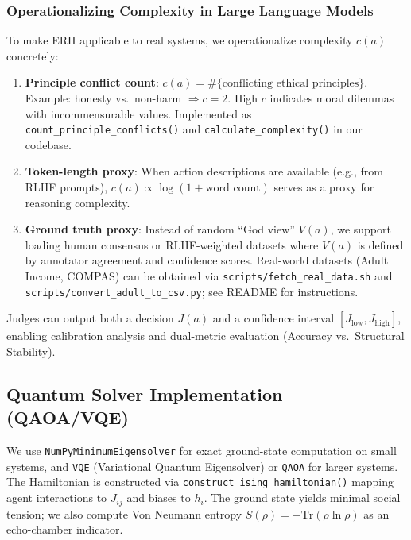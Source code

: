 \documentclass[12pt,a4paper]{article}
\theoremstyle{definition}
\theoremstyle{remark}
\begin{document}
\subsubsection{Operationalizing Complexity in Large Language Models}
\label{sec:operationalizing}

To make ERH applicable to real systems, we operationalize complexity $c(a)$ concretely:

\begin{enumerate}
    \item \textbf{Principle conflict count}: $c(a) = \#\{\text{conflicting ethical principles}\}$. Example: honesty vs.\ non-harm $\Rightarrow c = 2$. High $c$ indicates moral dilemmas with incommensurable values. Implemented as \texttt{count\_principle\_conflicts()} and \texttt{calculate\_complexity()} in our codebase.
    \item \textbf{Token-length proxy}: When action descriptions are available (e.g., from RLHF prompts), $c(a) \propto \log(1 + \text{word count})$ serves as a proxy for reasoning complexity.
    \item \textbf{Ground truth proxy}: Instead of random ``God view'' $V(a)$, we support loading human consensus or RLHF-weighted datasets where $V(a)$ is defined by annotator agreement and confidence scores. Real-world datasets (Adult Income, COMPAS) can be obtained via \texttt{scripts/fetch\_real\_data.sh} and \texttt{scripts/convert\_adult\_to\_csv.py}; see README for instructions.
\end{enumerate}

Judges can output both a decision $J(a)$ and a confidence interval $[J_{\text{low}}, J_{\text{high}}]$, enabling calibration analysis and dual-metric evaluation (Accuracy vs.\ Structural Stability).

\subsection{Quantum Solver Implementation (QAOA/VQE)}
\label{sec:quantum-solver}

We use \texttt{NumPyMinimumEigensolver} for exact ground-state computation on small systems, and \texttt{VQE} (Variational Quantum Eigensolver) or \texttt{QAOA} for larger systems. The Hamiltonian is constructed via \texttt{construct\_ising\_hamiltonian()} mapping agent interactions to $J_{ij}$ and biases to $h_i$. The ground state yields minimal social tension; we also compute Von Neumann entropy $S(\rho) = -\text{Tr}(\rho \ln \rho)$ as an echo-chamber indicator.
\end{document}
